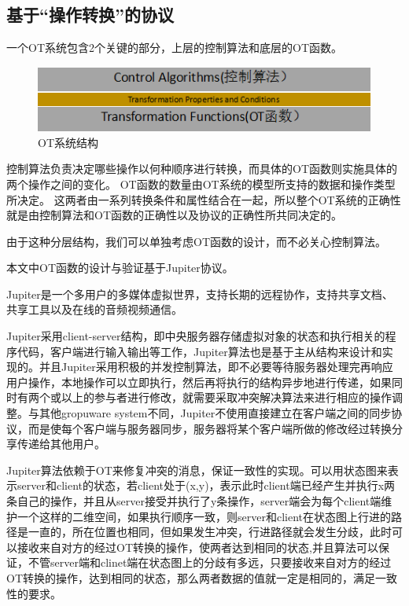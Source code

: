 \subsection{基于``操作转换''的协议}
一个OT系统包含2个关键的部分，上层的控制算法和底层的OT函数。
\begin{figure}[H]
\centering
\includegraphics{figures/structure.bmp}
\caption{OT系统结构}
\end{figure}

控制算法负责决定哪些操作以何种顺序进行转换，而具体的OT函数则实施具体的两个操作之间的变化。
OT函数的数量由OT系统的模型所支持的数据和操作类型所决定。
这两者由一系列转换条件和属性结合在一起，所以整个OT系统的正确性就是由控制算法和OT函数的正确性以及协议的正确性所共同决定的。

由于这种分层结构，我们可以单独考虑OT函数的设计，而不必关心控制算法。

本文中OT函数的设计与验证基于Jupiter协议\cite{nichols1995high-latency}。

Jupiter是一个多用户的多媒体虚拟世界，支持长期的远程协作，支持共享文档、共享工具以及在线的音频视频通信。

Jupiter采用client-server结构，即中央服务器存储虚拟对象的状态和执行相关的程序代码，客户端进行输入输出等工作，Jupiter算法也是基于主从结构来设计和实现的。并且Jupiter采用积极的并发控制算法，即不必要等待服务器处理完再响应用户操作，本地操作可以立即执行，然后再将执行的结构异步地进行传递，如果同时有两个或以上的参与者进行修改，就需要采取冲突解决算法来进行相应的操作调整。与其他gropuware system不同，Jupiter不使用直接建立在客户端之间的同步协议，而是使每个客户端与服务器同步，服务器将某个客户端所做的修改经过转换分享传递给其他用户。

Jupiter算法依赖于OT来修复冲突的消息，保证一致性的实现。可以用状态图来表示server和client的状态，若client处于(x,y)，表示此时client端已经产生并执行x两条自己的操作，并且从server接受并执行了y条操作，server端会为每个client端维护一个这样的二维空间，如果执行顺序一致，则server和client在状态图上行进的路径是一直的，所在位置也相同，但如果发生冲突，行进路径就会发生分歧，此时可以接收来自对方的经过OT转换的操作，使两者达到相同的状态,并且算法可以保证，不管server端和clinet端在状态图上的分歧有多远，只要接收来自对方的经过OT转换的操作，达到相同的状态，那么两者数据的值就一定是相同的，满足一致性的要求。

